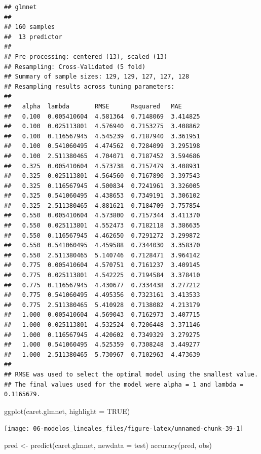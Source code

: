 \documentclass[
  spanish,
]{book}
\newenvironment{Shaded}{\begin{snugshade}}{\end{snugshade}}
\newcommand{\AttributeTok}[1]{\textcolor[rgb]{0.77,0.63,0.00}{#1}}
\newcommand{\ConstantTok}[1]{\textcolor[rgb]{0.00,0.00,0.00}{#1}}
\newcommand{\FunctionTok}[1]{\textcolor[rgb]{0.00,0.00,0.00}{#1}}
\newcommand{\NormalTok}[1]{#1}
\newcommand{\OtherTok}[1]{\textcolor[rgb]{0.56,0.35,0.01}{#1}}
\theoremstyle{break}
\theoremstyle{definition}
\theoremstyle{definition}
\theoremstyle{definition}
\theoremstyle{definition}
\theoremstyle{remark}
\begin{document}
\begin{verbatim}
## glmnet 
## 
## 160 samples
##  13 predictor
## 
## Pre-processing: centered (13), scaled (13) 
## Resampling: Cross-Validated (5 fold) 
## Summary of sample sizes: 129, 129, 127, 127, 128 
## Resampling results across tuning parameters:
## 
##   alpha  lambda       RMSE      Rsquared   MAE     
##   0.100  0.005410604  4.581364  0.7148069  3.414825
##   0.100  0.025113801  4.576940  0.7153275  3.408862
##   0.100  0.116567945  4.545239  0.7187940  3.361951
##   0.100  0.541060495  4.474562  0.7284099  3.295198
##   0.100  2.511380465  4.704071  0.7187452  3.594686
##   0.325  0.005410604  4.573738  0.7157479  3.408931
##   0.325  0.025113801  4.564560  0.7167890  3.397543
##   0.325  0.116567945  4.500834  0.7241961  3.326005
##   0.325  0.541060495  4.438653  0.7349191  3.306102
##   0.325  2.511380465  4.881621  0.7184709  3.757854
##   0.550  0.005410604  4.573800  0.7157344  3.411370
##   0.550  0.025113801  4.552473  0.7182118  3.386635
##   0.550  0.116567945  4.462650  0.7291272  3.299872
##   0.550  0.541060495  4.459588  0.7344030  3.358370
##   0.550  2.511380465  5.140746  0.7128471  3.964142
##   0.775  0.005410604  4.570751  0.7161237  3.409145
##   0.775  0.025113801  4.542225  0.7194584  3.378410
##   0.775  0.116567945  4.430677  0.7334438  3.277212
##   0.775  0.541060495  4.495356  0.7323161  3.413533
##   0.775  2.511380465  5.410928  0.7138082  4.213179
##   1.000  0.005410604  4.569043  0.7162973  3.407715
##   1.000  0.025113801  4.532524  0.7206448  3.371146
##   1.000  0.116567945  4.420602  0.7349329  3.279275
##   1.000  0.541060495  4.525359  0.7308248  3.449277
##   1.000  2.511380465  5.730967  0.7102963  4.473639
## 
## RMSE was used to select the optimal model using the smallest value.
## The final values used for the model were alpha = 1 and lambda = 0.1165679.
\end{verbatim}

\begin{Shaded}
\begin{Highlighting}[]
\FunctionTok{ggplot}\NormalTok{(caret.glmnet, }\AttributeTok{highlight =} \ConstantTok{TRUE}\NormalTok{)}
\end{Highlighting}
\end{Shaded}

\begin{center}\texttt{[image: 06-modelos\_lineales\_files/figure-latex/unnamed-chunk-39-1]} \end{center}

\begin{Shaded}
\begin{Highlighting}[]
\NormalTok{pred }\OtherTok{\textless{}{-}} \FunctionTok{predict}\NormalTok{(caret.glmnet, }\AttributeTok{newdata =}\NormalTok{ test)}
\FunctionTok{accuracy}\NormalTok{(pred, obs)}
\end{Highlighting}
\end{Shaded}
\end{document}
